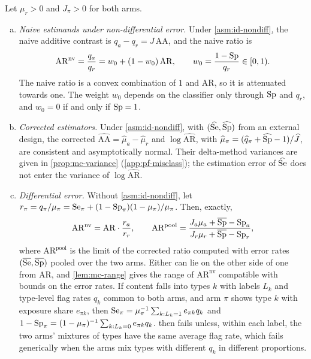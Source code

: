 \begin{theorem}\label{thm:misclass}
Let $\mu_r>0$ and $J_\pi>0$ for both arms.
\begin{enumerate}[(a)]
  \item \emph{Naive estimands under non-differential error.} Under \cref{asm:id-nondiff}, the naive additive contrast is $q_a-q_r=J\,\mathrm{AA}$, and the naive ratio is
  \begin{equation}\label{eq:mc-attenuation}
    \mathrm{AR}^{\mathrm{nv}}=\frac{q_a}{q_r}=w_0+(1-w_0)\,\mathrm{AR},\qquad w_0=\frac{1-\mathrm{Sp}}{q_r}\in[0,1).
  \end{equation}
  The naive ratio is a convex combination of $1$ and $\mathrm{AR}$, so it is attenuated towards one. The weight $w_0$ depends on the classifier only through $\mathrm{Sp}$ and $q_r$, and $w_0=0$ if and only if $\mathrm{Sp}=1$.
  \item \emph{Corrected estimators.} Under \cref{asm:id-nondiff}, with $(\widehat{\mathrm{Se}},\widehat{\mathrm{Sp}})$ from an external design, the corrected $\widehat{\mathrm{AA}}=\widehat\mu_a-\widehat\mu_r$ and $\log\widehat{\mathrm{AR}}$, with $\widehat\mu_\pi=(\widehat q_\pi+\widehat{\mathrm{Sp}}-1)/\widehat J$, are consistent and asymptotically normal. Their delta-method variances are given in \cref{prop:mc-variance} (\cref{app:pf-misclass}); the estimation error of $\widehat{\mathrm{Se}}$ does not enter the variance of $\log\widehat{\mathrm{AR}}$.
  \item \emph{Differential error.} Without \cref{asm:id-nondiff}, let $r_\pi=q_\pi/\mu_\pi=\mathrm{Se}_\pi+(1-\mathrm{Sp}_\pi)(1-\mu_\pi)/\mu_\pi$. Then, exactly,
  \begin{equation}\label{eq:mc-diff}
    \mathrm{AR}^{\mathrm{nv}}=\mathrm{AR}\cdot\frac{r_a}{r_r},\qquad
    \mathrm{AR}^{\mathrm{pool}}=\frac{J_a\mu_a+\overline{\mathrm{Sp}}-\mathrm{Sp}_a}{J_r\mu_r+\overline{\mathrm{Sp}}-\mathrm{Sp}_r},
  \end{equation}
  where $\mathrm{AR}^{\mathrm{pool}}$ is the limit of the corrected ratio computed with error rates $(\overline{\mathrm{Se}},\overline{\mathrm{Sp}})$ pooled over the two arms. Either can lie on the other side of one from $\mathrm{AR}$, and \cref{lem:mc-range} gives the range of $\mathrm{AR}^{\mathrm{nv}}$ compatible with bounds on the error rates. If content falls into types $k$ with labels $L_k$ and type-level flag rates $q_k$ common to both arms, and arm $\pi$ shows type $k$ with exposure share $e_{\pi k}$, then $\mathrm{Se}_\pi=\mu_\pi^{-1}\sum_{k:L_k=1}e_{\pi k}q_k$ and $1-\mathrm{Sp}_\pi=(1-\mu_\pi)^{-1}\sum_{k:L_k=0}e_{\pi k}q_k$.  then fails unless, within each label, the two arms' mixtures of types have the same average flag rate, which fails generically when the arms mix types with different $q_k$ in different proportions.

\end{enumerate}
\end{theorem}
